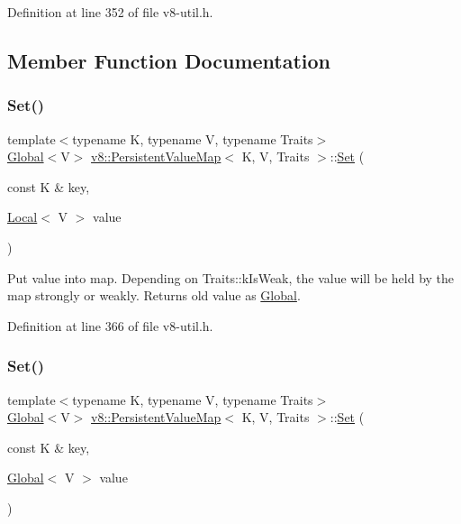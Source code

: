 Definition at line 352 of file v8-\/util.\+h.



\subsection{Member Function Documentation}
\mbox{\label{classv8_1_1PersistentValueMap_a4527a2e1b25a9f1772317f948382d9f9}} 
\subsubsection{\texorpdfstring{Set()}{Set()}\hspace{0.1cm}{\footnotesize\ttfamily [1/3]}}
{\footnotesize\ttfamily template$<$typename K, typename V, typename Traits$>$ \\
\mbox{\hyperlink{classv8_1_1Global}{Global}}$<$V$>$ \mbox{\hyperlink{classv8_1_1PersistentValueMap}{v8\+::\+Persistent\+Value\+Map}}$<$ K, V, Traits $>$\+::\mbox{\hyperlink{classv8_1_1Set}{Set}} (\begin{DoxyParamCaption}\item[{const K \&}]{key,  }\item[{\mbox{\hyperlink{classv8_1_1Local}{Local}}$<$ V $>$}]{value }\end{DoxyParamCaption})\hspace{0.3cm}{\ttfamily [inline]}}

Put value into map. Depending on Traits\+::k\+Is\+Weak, the value will be held by the map strongly or weakly. Returns old value as \mbox{\hyperlink{classv8_1_1Global}{Global}}. 

Definition at line 366 of file v8-\/util.\+h.

\mbox{\label{classv8_1_1PersistentValueMap_a00f89f1b7665698349f98b04d0059180}} 
\subsubsection{\texorpdfstring{Set()}{Set()}\hspace{0.1cm}{\footnotesize\ttfamily [2/3]}}
{\footnotesize\ttfamily template$<$typename K, typename V, typename Traits$>$ \\
\mbox{\hyperlink{classv8_1_1Global}{Global}}$<$V$>$ \mbox{\hyperlink{classv8_1_1PersistentValueMap}{v8\+::\+Persistent\+Value\+Map}}$<$ K, V, Traits $>$\+::\mbox{\hyperlink{classv8_1_1Set}{Set}} (\begin{DoxyParamCaption}\item[{const K \&}]{key,  }\item[{\mbox{\hyperlink{classv8_1_1Global}{Global}}$<$ V $>$}]{value }\end{DoxyParamCaption})\hspace{0.3cm}{\ttfamily [inline]}}


